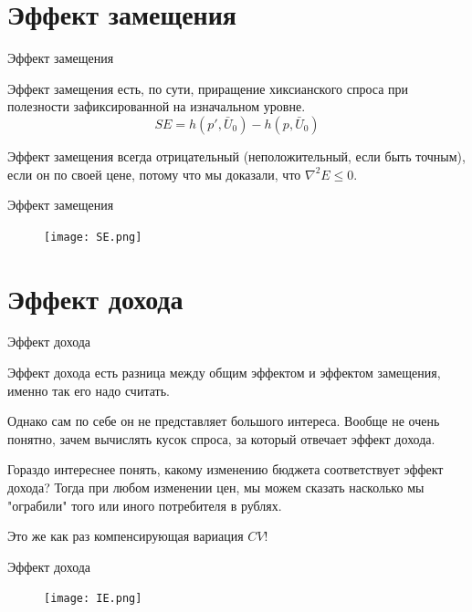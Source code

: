 \documentclass{beamer}
\begin{document}
\section{Эффект замещения}

\begin{frame}{Эффект замещения}

Эффект замещения есть, по сути, приращение хиксианского спроса при полезности зафиксированной на изначальном уровне. 
$$ SE = h(p', \bar U_0) - h(p, \bar U_0) $$

Эффект замещения всегда отрицательный (неположительный, если быть точным), если он по своей цене, потому что мы доказали, что $\nabla^2 E \leqslant 0$.

\end{frame}

\begin{frame}{Эффект замещения}

\begin{figure}[hbt]
\centering
\texttt{[image: SE.png]}
\end{figure}

\end{frame}

\section{Эффект дохода}

\begin{frame}{Эффект дохода}

Эффект дохода есть разница между общим эффектом и эффектом замещения, именно так его надо считать. 

Однако сам по себе он не представляет большого интереса. Вообще не очень понятно, зачем вычислять кусок спроса, за который отвечает эффект дохода. 

Гораздо интереснее понять, какому изменению бюджета соответствует эффект дохода? Тогда при любом изменении цен, мы можем сказать насколько мы "ограбили" того или иного потребителя в рублях.

Это же как раз компенсирующая вариация $CV$!

\end{frame}

\begin{frame}{Эффект дохода}

\begin{figure}[hbt]
\centering
\texttt{[image: IE.png]}
\end{figure}

\end{frame}
\end{document}

